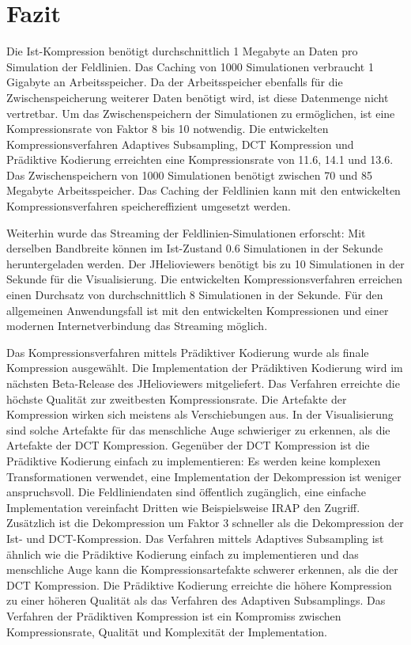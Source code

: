 \section{Fazit}
Die Ist-Kompression benötigt durchschnittlich 1 Megabyte an Daten pro Simulation der Feldlinien. Das Caching von 1000 Simulationen verbraucht 1 Gigabyte an Arbeitsspeicher. Da der Arbeitsspeicher ebenfalls für die Zwischenspeicherung weiterer Daten benötigt wird, ist diese Datenmenge nicht vertretbar. Um das Zwischenspeichern der Simulationen zu ermöglichen, ist eine Kompressionsrate von Faktor 8 bis 10 notwendig. Die entwickelten Kompressionsverfahren Adaptives Subsampling, DCT Kompression und Prädiktive Kodierung erreichten eine Kompressionsrate von 11.6, 14.1 und 13.6. Das Zwischenspeichern von 1000 Simulationen benötigt zwischen 70 und 85 Megabyte Arbeitsspeicher. Das Caching der Feldlinien kann mit den entwickelten Kompressionsverfahren speichereffizient umgesetzt werden.

Weiterhin wurde das Streaming der Feldlinien-Simulationen erforscht: Mit derselben Bandbreite können im Ist-Zustand 0.6 Simulationen in der Sekunde heruntergeladen werden. Der JHelioviewers benötigt bis zu 10 Simulationen in der Sekunde für die Visualisierung. Die entwickelten Kompressionsverfahren erreichen einen Durchsatz von durchschnittlich 8 Simulationen in der Sekunde. Für den allgemeinen Anwendungsfall ist mit den entwickelten Kompressionen und einer modernen Internetverbindung das Streaming möglich.

Das Kompressionsverfahren mittels Prädiktiver Kodierung wurde als finale Kompression ausgewählt. Die Implementation der Prädiktiven Kodierung wird im nächsten Beta-Release des JHelioviewers mitgeliefert. Das Verfahren erreichte die höchste Qualität zur zweitbesten Kompressionsrate. Die Artefakte der Kompression wirken sich meistens als Verschiebungen aus. In der Visualisierung sind solche Artefakte für das menschliche Auge schwieriger zu erkennen, als die Artefakte der DCT Kompression. Gegenüber der DCT Kompression ist die Prädiktive Kodierung einfach zu implementieren: Es werden keine komplexen Transformationen verwendet, eine Implementation der Dekompression ist weniger anspruchsvoll. Die Feldliniendaten sind öffentlich zugänglich, eine einfache Implementation vereinfacht Dritten wie Beispielsweise IRAP \cite{website:irap} den Zugriff. Zusätzlich ist die Dekompression um Faktor 3 schneller als die Dekompression der Ist- und DCT-Kompression. Das Verfahren mittels Adaptives Subsampling ist ähnlich wie die Prädiktive Kodierung einfach zu implementieren und das menschliche Auge kann die Kompressionsartefakte schwerer erkennen, als die der DCT Kompression. Die Prädiktive Kodierung erreichte die höhere Kompression zu einer höheren Qualität als das Verfahren des Adaptiven Subsamplings. Das Verfahren der Prädiktiven Kompression ist ein Kompromiss zwischen Kompressionsrate, Qualität und Komplexität der Implementation.

